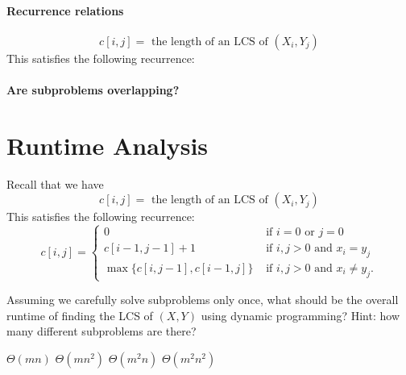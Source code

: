\documentclass[11  pt]{article}
\begin{document}
\vs{1cm}

\paragraph{Recurrence relations}
\begin{equation*}
	c[i,j] =  {\text{ the length of an LCS of $(X_i, Y_j)$}}
\end{equation*}
This satisfies the following recurrence:

\pagebreak

\paragraph{Are subproblems overlapping?}


\newpage

\section{Runtime Analysis}
Recall that we have
\begin{equation*}
	c[i,j] = \text{ the length of an LCS of $(X_i, Y_j)$}
\end{equation*}
This satisfies the following recurrence:
\begin{equation*}
	c[i,j] =\begin{cases}
		0 & \text{ if $i = 0$ or $j = 0$} \\
		c[i-1, j-1] + 1 & \text{ if $i,j > 0$ and $x_{i} = y_j$}\\
		\max \{ c[i,j-1], c[i-1,j]\} & \text{ if $i,j > 0$ and $x_i \neq y_j$}.
	\end{cases}
\end{equation*}

\begin{Qu}
	Assuming we carefully solve subproblems only once, what should be the overall runtime of finding the LCS of $(X,Y)$ using dynamic programming? Hint: how many different subproblems are there?
	\begin{itemize}
		\aitem $\Theta (mn)$ 
		\bitem $\Theta (m n^2)$
		\citem $\Theta (m^2 n )$
		\ditem $\Theta (m^2 n^2)$
	\end{itemize}
\end{Qu}
\end{document}
